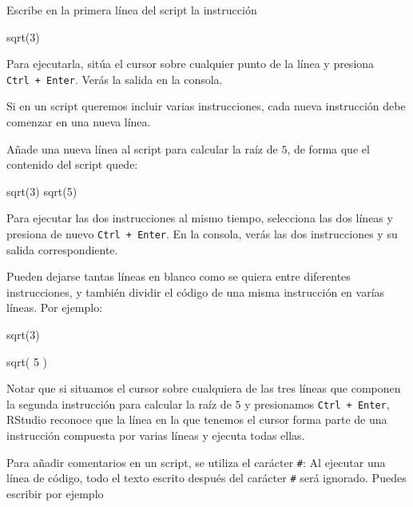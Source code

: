 \documentclass[
  title=normal,
  notoc,
  bib=normal]{mnye}
\newenvironment{Shaded}{\begin{snugshade}}{\end{snugshade}}
\newcommand{\NormalTok}[1]{#1}
\begin{document}
Escribe en la primera línea del script la instrucción

\begin{Shaded}
\begin{Highlighting}[]
\NormalTok{sqrt(3)}
\end{Highlighting}
\end{Shaded}

Para ejecutarla, sitúa el cursor sobre cualquier punto de la línea y presiona \texttt{Ctrl\ +\ Enter}. Verás la salida en la consola.

Si en un script queremos incluir varias instrucciones, cada nueva instrucción debe comenzar en una nueva línea.

Añade una nueva línea al script para calcular la raíz de \(5\), de forma que el contenido del script quede:

\begin{Shaded}
\begin{Highlighting}[]
\NormalTok{sqrt(3)}
\NormalTok{sqrt(5)}
\end{Highlighting}
\end{Shaded}

Para ejecutar las dos instrucciones al mismo tiempo, selecciona las dos líneas y presiona de nuevo \texttt{Ctrl\ +\ Enter}. En la consola, verás las dos instrucciones y su salida correspondiente.

Pueden dejarse tantas líneas en blanco como se quiera entre diferentes instrucciones, y también dividir el código de una misma instrucción en varías líneas. Por ejemplo:

\begin{Shaded}
\begin{Highlighting}[]
\NormalTok{sqrt(3)}

\NormalTok{sqrt(}
\NormalTok{    5}
\NormalTok{)}
\end{Highlighting}
\end{Shaded}

Notar que si situamos el cursor sobre cualquiera de las tres líneas que componen la segunda instrucción para calcular la raíz de \(5\) y presionamos \texttt{Ctrl\ +\ Enter}, \textsf{RStudio} reconoce que la línea en la que tenemos el cursor forma parte de una instrucción compuesta por varias líneas y ejecuta todas ellas.

Para añadir comentarios en un script, se utiliza el carácter \texttt{\#}: Al ejecutar una línea de código, todo el texto escrito después del carácter \texttt{\#} será ignorado. Puedes escribir por ejemplo
\end{document}
